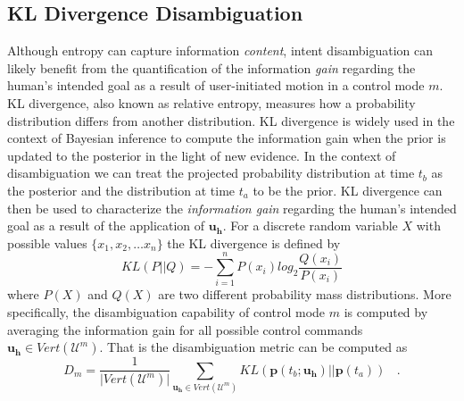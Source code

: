 \documentclass[conference]{IEEEtran}
\begin{document}
\subsection{KL Divergence Disambiguation}\label{sssec:kl}
Although entropy can capture information \textit{content}, intent disambiguation can likely benefit from the quantification of the information \textit{gain} regarding the human's intended goal as a result of user-initiated motion in a control mode $m$. 
KL divergence, also known as relative entropy, measures how a probability distribution differs from another distribution. KL divergence is widely used in the context of Bayesian inference to compute the information gain when the prior is updated to the posterior in the light of new evidence. In the context of disambiguation we can treat the projected probability distribution at time $t_b$ as the posterior and the distribution at time $t_a$ to be the prior. KL divergence can then be used to characterize the \textit{information gain} regarding the human's intended goal as a result of the application of $\boldsymbol{u_h}$.
For a discrete random variable $X$ with possible values $\{x_1, x_2,\dots x_n\}$ the KL divergence is defined by
\begin{equation*}
KL(P||Q) = -\sum_{i=1}^{n}P(x_i)log_2\frac{Q(x_i)}{P(x_i)}
\end{equation*}
where $P(X)$ and $Q(X)$ are two different probability mass distributions. 
  More specifically, the disambiguation capability of control mode $m$ is computed by averaging the information gain for all possible control commands $\boldsymbol{u_h} \in Vert(\mathcal{U}^m)$. That is the disambiguation metric can be computed as 
\begin{equation*}
D_m = \frac{1}{\vert Vert(\mathcal{U}^m) \vert}\sum_{\boldsymbol{u_h} \in Vert(\mathcal{U}^m)} KL(\boldsymbol{p}(t_b; \boldsymbol{u_h})||\boldsymbol{p}(t_a))~~~~.
\end{equation*}
\end{document}
